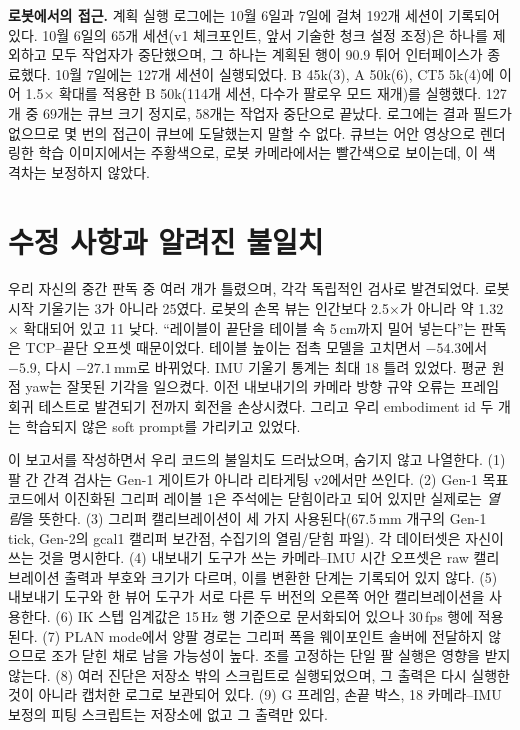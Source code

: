 \documentclass[conference,10pt]{IEEEtran}
\newcommand{\mm}{\,mm\xspace}
\begin{document}
\textbf{로봇에서의 접근.} 계획 실행 로그에는 10월 6일과 7일에 걸쳐 192개 세션이 기록되어 있다. 10월 6일의 65개 세션(v1 체크포인트,
앞서 기술한 청크 설정 조정)은 하나를 제외하고 모두 작업자가 중단했으며, 그 하나는 계획된 행이 90.9\textdegree{} 튀어 인터페이스가
종료했다. 10월 7일에는 127개 세션이 실행되었다. B 45k(3), A 50k(6), CT5 5k(4)에 이어 1.5$\times$ 확대를 적용한 B 50k(114개 세션, 다수가
팔로우 모드 재개)를 실행했다. 127개 중 69개는 큐브 크기 정지로, 58개는 작업자 중단으로 끝났다. 로그에는 결과 필드가 없으므로 몇 번의
접근이 큐브에 도달했는지 말할 수 없다. 큐브는 어안 영상으로 렌더링한 학습 이미지에서는 주황색으로, 로봇 카메라에서는 빨간색으로
보이는데, 이 색 격차는 보정하지 않았다.

\section{수정 사항과 알려진 불일치}\label{sec:corr}
우리 자신의 중간 판독 중 여러 개가 틀렸으며, 각각 독립적인 검사로 발견되었다. 로봇 시작 기울기는 3\textdegree{}가 아니라
25\textdegree{}였다. 로봇의 손목 뷰는 인간보다 2.5$\times$가 아니라 약 1.32$\times$ 확대되어 있고 11\textdegree{} 낮다. ``레이블이
끝단을 테이블 속 5\,cm까지 밀어 넣는다''는 판독은 TCP--끝단 오프셋 때문이었다. 테이블 높이는 접촉 모델을 고치면서 $-54.3$에서
$-5.9$, 다시 $-27.1$\mm{}로 바뀌었다. IMU 기울기 통계는 최대 18\textdegree{} 틀려 있었다. 평균 원점 yaw는 잘못된 기각을 일으켰다.
이전 내보내기의 카메라 방향 규약 오류는 프레임 회귀 테스트로 발견되기 전까지 회전을 손상시켰다. 그리고 우리 embodiment id 두 개는
학습되지 않은 soft prompt를 가리키고 있었다.

이 보고서를 작성하면서 우리 코드의 불일치도 드러났으며, 숨기지 않고 나열한다. (1) 팔 간 간격 검사는 Gen-1 게이트가 아니라 리타게팅
v2에서만 쓰인다. (2) Gen-1 목표 코드에서 이진화된 그리퍼 레이블 1은 주석에는 닫힘이라고 되어 있지만 실제로는 \emph{열림}을 뜻한다.
(3) 그리퍼 캘리브레이션이 세 가지 사용된다(67.5\mm{} 개구의 Gen-1 tick, Gen-2의 gcal1 캘리퍼 보간점, 수집기의 열림/닫힘 파일). 각
데이터셋은 자신이 쓰는 것을 명시한다. (4) 내보내기 도구가 쓰는 카메라--IMU 시간 오프셋은 raw 캘리브레이션 출력과 부호와 크기가
다르며, 이를 변환한 단계는 기록되어 있지 않다. (5) 내보내기 도구와 한 뷰어 도구가 서로 다른 두 버전의 오른쪽 어안 캘리브레이션을
사용한다. (6) IK 스텝 임계값은 15\,Hz 행 기준으로 문서화되어 있으나 30\,fps 행에 적용된다. (7) PLAN mode에서 양팔 경로는 그리퍼 폭을
웨이포인트 솔버에 전달하지 않으므로 조가 닫힌 채로 남을 가능성이 높다. 조를 고정하는 단일 팔 실행은 영향을 받지 않는다. (8) 여러
진단은 저장소 밖의 스크립트로 실행되었으며, 그 출력은 다시 실행한 것이 아니라 캡처한 로그로 보관되어 있다. (9) G 프레임, 손끝 박스,
18\textdegree{} 카메라--IMU 보정의 피팅 스크립트는 저장소에 없고 그 출력만 있다.
\end{document}

